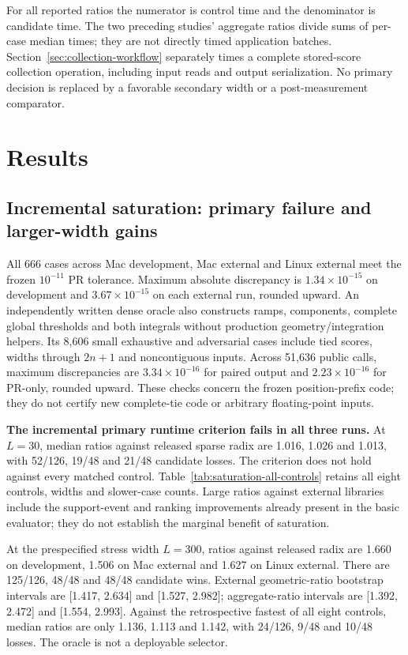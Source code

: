 For all reported ratios the numerator is control time and the denominator
is candidate time. The two preceding studies' aggregate ratios divide sums
of per-case median times; they are not directly timed application batches.
Section~\ref{sec:collection-workflow} separately times a complete stored-score
collection operation, including input reads and output serialization.
No primary decision is
replaced by a favorable secondary width or a post-measurement comparator.

\section{Results}




\subsection{Incremental saturation: primary failure and larger-width gains}
All 666 cases across Mac development, Mac external and Linux external meet
the frozen $10^{-11}$ PR tolerance. Maximum absolute discrepancy is
$1.34\times10^{-15}$ on development and $3.67\times10^{-15}$ on each
external run, rounded upward. An independently written dense oracle also
constructs ramps, components, complete global thresholds and both integrals
without production geometry/integration helpers. Its 8,606 small exhaustive
and adversarial cases include tied scores, widths through $2n+1$ and
noncontiguous inputs. Across 51,636 public calls, maximum discrepancies are
$3.34\times10^{-16}$ for paired output and $2.23\times10^{-16}$ for PR-only,
rounded upward. These checks concern the frozen position-prefix code;
they do not certify new complete-tie code or arbitrary floating-point inputs.

\textbf{The incremental primary runtime criterion fails in all three runs.}
At $L=30$, median ratios against released sparse radix are 1.016, 1.026 and
1.013, with 52/126, 19/48 and 21/48 candidate losses. The criterion does not
hold against every matched control. Table~\ref{tab:saturation-all-controls}
retains all eight controls, widths and slower-case counts. Large ratios
against external libraries include the support-event and ranking improvements
already present in the basic evaluator; they do not establish the marginal
benefit of saturation.


At the prespecified stress width $L=300$, ratios against released radix are
1.660 on development, 1.506 on Mac external and 1.627 on Linux external.
There are 125/126, 48/48 and 48/48 candidate wins. External geometric-ratio
bootstrap intervals are [1.417, 2.634] and [1.527, 2.982]; aggregate-ratio
intervals are [1.392, 2.472] and [1.554, 2.993]. Against the retrospective
fastest of all eight controls, median ratios are only 1.136, 1.113 and 1.142,
with 24/126, 9/48 and 10/48 losses. The oracle is not a deployable selector.

